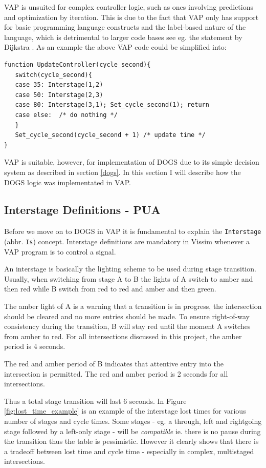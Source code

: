 VAP is unsuited for complex controller logic, such as ones involving predictions and optimization by iteration. This is due to the fact that VAP only has support for basic programming language constructs and the label-based nature of the language, which is detrimental to larger code bases see eg. the statement by Dijkstra \cite{nogoto}. As an example the above VAP code could be simplified into:

\begin{verbatim}
function UpdateController(cycle_second){
   switch(cycle_second){
   case 35: Interstage(1,2)
   case 50: Interstage(2,3)
   case 80: Interstage(3,1); Set_cycle_second(1); return
   case else:  /* do nothing */
   }
   Set_cycle_second(cycle_second + 1) /* update time */
}
\end{verbatim}

VAP is suitable, however, for implementation of DOGS due to its simple decision system as described in section \ref{dogs}. In this section I will describe how the DOGS logic was implementated in VAP.

\subsection{Interstage Definitions - PUA}
Before we move on to DOGS in VAP it is fundamental to explain the \verb|Interstage| (abbr. \verb|Is|) concept. Interstage definitions are mandatory in Vissim whenever a VAP program is to control a signal.

An interstage is basically the lighting scheme to be used during stage transition. Usually, when switching from stage A to B the lights of A switch to amber and then red while B switch from red to red and amber and then green.

The amber light of A is a warning that a transition is in progress, the intersection should be cleared and no more entries should be made. To ensure right-of-way consistency during the transition, B will stay red until the moment A switches from amber to red. For all intersections discussed in this project, the amber period is 4 seconds.

The red and amber period of B indicates that attentive entry into the intersection is permitted. The red and amber period is 2 seconds for all intersections.

Thus a total stage transition will last 6 seconds. In Figure \ref{fig:lost_time_example} is an example of the interstage lost times for various number of stages and cycle times. Some stages - eg. a through, left and rightgoing stage followed by a left-only stage - will be \textit{compatible} ie. there is no pause during the transition thus the table is pessimistic. However it clearly shows that there is a tradeoff between lost time and cycle time - especially in complex, multistaged intersections.

